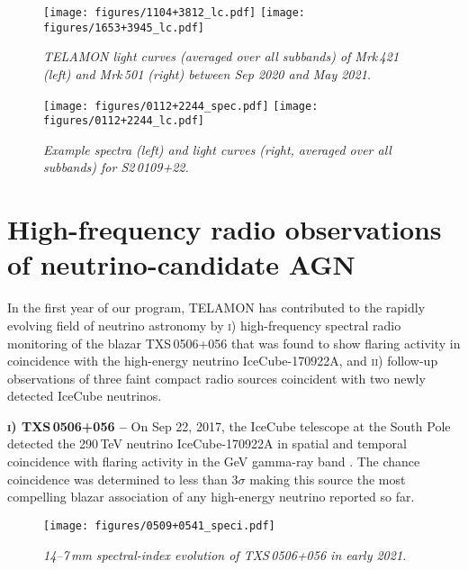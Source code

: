 \documentclass[a4paper,11pt]{article}
\begin{document}
\begin{figure}
    \centering
    \texttt{[image: figures/1104+3812\_lc.pdf]}
    \texttt{[image: figures/1653+3945\_lc.pdf]}
    \caption{\small \sl TELAMON light curves (averaged over all subbands) of Mrk\,421 (left) and Mrk\,501 (right) between Sep 2020 and May 2021. }
    \label{fig:mrk421_mrk501}
\end{figure}

\begin{figure}
    \centering
    \texttt{[image: figures/0112+2244\_spec.pdf]}
    \texttt{[image: figures/0112+2244\_lc.pdf]}
    \caption{\small \sl Example spectra (left) and light curves (right, averaged over all subbands) for S2\,0109+22.}
    \label{fig:0112}
\end{figure}

\section{High-frequency radio observations of neutrino-candidate AGN}
\noindent
In the first year of our program, TELAMON has contributed to the rapidly evolving field of neutrino astronomy by \textsc{i)} high-frequency spectral radio monitoring of the blazar TXS\,0506+056 that was found to show flaring activity in coincidence with the high-energy neutrino IceCube-170922A, and \textsc{ii)}  follow-up observations of three faint compact radio sources coincident with two newly detected IceCube neutrinos.

\textbf{\textsc{i)} TXS\,0506+056 --} On Sep 22, 2017, the IceCube telescope at the South Pole detected the 290\,TeV neutrino IceCube-170922A in spatial and temporal coincidence with flaring activity in the GeV gamma-ray band \cite{IceCube:2018dnn}. The chance coincidence was determined to less than $3 \sigma$ making this source the most compelling blazar association of any high-energy neutrino reported so far.

\begin{wrapfigure}{r}{0cm}
    \centering
    \texttt{[image: figures/0509+0541\_speci.pdf]}
    \caption{\small \sl 14--7\,mm spectral-index evolution of TXS\,0506+056 in early 2021. }
    \label{fig:txs0506}
\end{wrapfigure}
\end{document}
